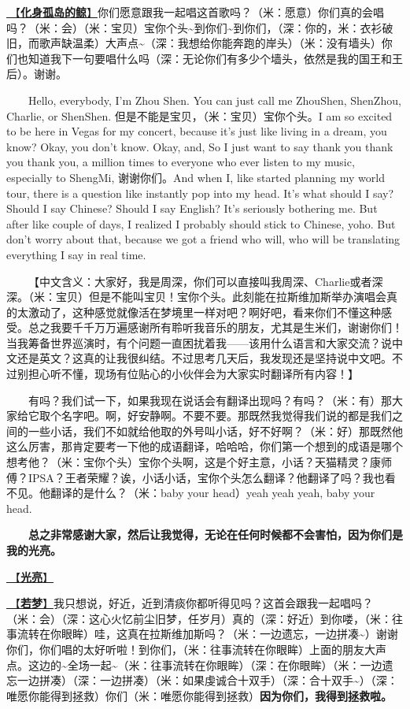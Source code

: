 \documentclass[]{ctexbook}
\begin{document}
\hyperref[hua-shen-gu-dao-de-jing]{🎵【\textbf{化身孤岛的鲸}】}你们愿意跟我一起唱这首歌吗？（米：愿意）你们真的会唱吗？（米：会）（米：宝贝）宝你个头\textasciitilde 到你们\textasciitilde 到你们，（深：你的，米：衣衫破旧，而歌声缺温柔）大声点\textasciitilde（深：我想给你能奔跑的岸头）（米：没有墙头）你们也知道我下一句要唱什么吗（深：无论你们有多少个墙头，依然是我的国王和王后）。谢谢。

  Hello, everybody, I'm Zhou Shen. You can just call me ZhouShen, ShenZhou, Charlie, or ShenShen. 但是不能是宝贝，（米：宝贝）宝你个头。I am so excited to be here in Vegas for my concert, because it's just like living in a dream, you know? Okay, you don't know. Okay, and, So I just want to say thank you thank you thank you, a million times to everyone who ever listen to my music, especially to ShengMi, 谢谢你们。And when I, like started planning my world tour, there is a question like instantly pop into my head. It's what should I say? Should I say Chinese? Should I say English? It's seriously bothering me. But after like couple of days, I realized I probably should stick to Chinese, yoho. But don't worry about that, because we got a friend who will, who will be translating everything I say in real time.

  【中文含义：大家好，我是周深，你们可以直接叫我周深、Charlie或者深深。（米：宝贝）但是不能叫宝贝！宝你个头。此刻能在拉斯维加斯举办演唱会真的太激动了，这种感觉就像活在梦境里一样对吧？啊好吧，看来你们不懂这种感受。总之我要千千万万遍感谢所有聆听我音乐的朋友，尤其是生米们，谢谢你们！当我筹备世界巡演时，有个问题一直困扰着我------该用什么语言和大家交流？说中文还是英文？这真的让我很纠结。不过思考几天后，我发现还是坚持说中文吧。不过别担心听不懂，现场有位贴心的小伙伴会为大家实时翻译所有内容！】

  有吗？我们试一下，如果我现在说话会有翻译出现吗？有吗？（米：有）那大家给它取个名字吧。啊，好安静啊。不要不要。那既然我觉得我们说的都是我们之间的一些小话，我们不如就给他取的外号叫小话，好不好啊？（米：好）那既然他这么厉害，那肯定要考一下他的成语翻译，哈哈哈，你们第一个想到的成语是哪个想考他？（米：宝你个头）宝你个头啊，这是个好主意，小话？天猫精灵？康师傅？IPSA？王者荣耀？诶，小话小话，宝你个头怎么翻译？他翻译了吗？我也看不见。他翻译的是什么？（米：baby your head）yeah yeah yeah, baby your head.

  \textbf{总之非常感谢大家，然后让我觉得，无论在任何时候都不会害怕，因为你们是我的光亮。}

\hyperref[silver-linings]{🎵【\textbf{光亮}】}

\hyperref[ruomeng]{🎵【\textbf{若梦}】}我只想说，好近，近到清痰你都听得见吗？这首会跟我一起唱吗？（米：会）（深：这心火忆前尘旧梦，任岁月）真的（深：好近）到你喽，（米：往事流转在你眼眸）哇，这真在拉斯维加斯吗？（米：一边遗忘，一边拼凑\textasciitilde）谢谢你们，你们唱的太好听啦！到你们，（米：往事流转在你眼眸）上面的朋友大声点。这边的\textasciitilde 全场一起\textasciitilde（米：往事流转在你眼眸）（深：在你眼眸）（米：一边遗忘一边拼凑）（深：一边拼凑）（米：如果虔诚合十双手）（深：合十双手\textasciitilde）（深：唯愿你能得到拯救）你们（米：唯愿你能得到拯救）\textbf{因为你们，我得到拯救啦。}
\end{document}

